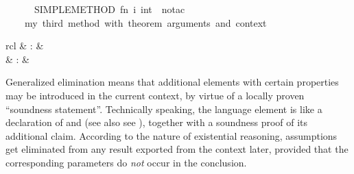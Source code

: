 \begin{isabellebody}
\ \ \ \ \ \ SIMPLE{}METHOD{}\ {}fn\ i{}\ int\ {}{}\ no{}tac{}{}\isanewline
\ \ {}\ \ {}my\ third\ method\ {}with\ theorem\ arguments\ and\ context{}{}%
\endisatagML
{\isafoldML}%
%
\isadelimML
%
\endisadelimML
%
\isamarkuptrue%
%
\begin{isamarkuptext}%
\begin{matharray}{rcl}
    \hypertarget{command.obtain}{\hyperlink{command.obtain}{\mbox{}}} & : &  \\
    \hypertarget{command.guess}{\hyperlink{command.guess}{\mbox{}}} & : &  \\
  \end{matharray}

  Generalized elimination means that additional elements with certain
  properties may be introduced in the current context, by virtue of a
  locally proven ``soundness statement''.  Technically speaking, the
  \hyperlink{command.obtain}{\mbox{}} language element is like a declaration of
  \hyperlink{command.fix}{\mbox{}} and \hyperlink{command.assume}{\mbox{}} (see also see
  ), together with a soundness proof of its
  additional claim.  According to the nature of existential reasoning,
  assumptions get eliminated from any result exported from the context
  later, provided that the corresponding parameters do \emph{not}
  occur in the conclusion.


\end{isamarkuptext}
\end{isabellebody}
